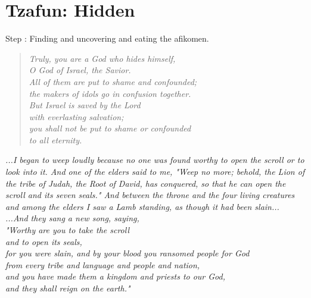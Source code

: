 \documentclass[10pt,oneside,footinclude=true,headinclude=true]{scrbook} %
\newcommand\quot[1]{
	\begin{quote}\textit{\small#1}\end{quote}
}
\newcommand\pagequot[1]{
	\newpage
	\clearscrheadfoot
	\vspace*{\stretch{2}}
	\begin{center}
	\begin{minipage}[c]{8cm}
		#1
	\end{minipage}
	\end{center}
	\vspace*{\stretch{3}}
}
\begin{document}
\chapter{Tzafun: Hidden}
\normalsize
Step \thechapter: Finding and uncovering and eating the afikomen.\\


\quot{Truly, you are a God who hides himself,\\
\hspace*{5mm}O God of Israel, the Savior.\\
All of them are put to shame and confounded;\\
\hspace*{5mm}the makers of idols go in confusion together.\\
But Israel is saved by the Lord\\
\hspace*{5mm}with everlasting salvation;\\
you shall not be put to shame or confounded\\
\hspace*{5mm}to all eternity.}


\pagequot{
\centering
\textit{...I began to weep loudly because no one was found worthy to open the scroll or to look into it. And one of the elders said to me, "Weep no more; behold, the Lion of the tribe of Judah, the Root of David, has conquered, so that he can open the scroll and its seven seals." And between the throne and the four living creatures and among the elders I saw a Lamb standing, as though it had been slain...\\
\vspace{2mm}
...And they sang a new song, saying,\\
"Worthy are you to take the scroll\\
\hspace*{5mm}and to open its seals,\\
for you were slain, and by your blood you ransomed people for God\\
\hspace*{5mm}from every tribe and language and people and nation,\\
and you have made them a kingdom and priests to our God,\\
\hspace*{5mm}and they shall reign on the earth."}\\
\bigskip
\spacedlowsmallcaps{Revelation 5:4-6, 9-10}
}
\end{document}
